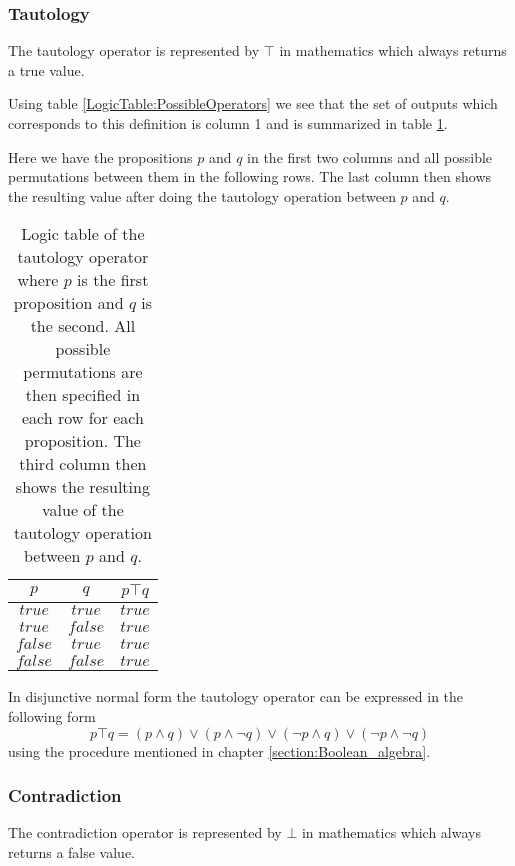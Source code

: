     \subsubsection{Tautology}
        The tautology operator is represented by $\top$ in mathematics which always returns a true value.
        
        Using table \ref{LogicTable:PossibleOperators} we see that the set of outputs which corresponds to this definition is column 1 and is summarized in table \ref{LogicTable:tautology}.
        
        Here we have the propositions $p$ and $q$ in the first two columns and all possible permutations between them in the following rows. The last column then shows the resulting value after doing the tautology operation between $p$ and $q$.
        
        \begin{table}[h!]
            \centering
            \begin{tabular}{|c|c|c|}
            	\hline
            	  $p$   &   $q$   & $p \top q$ \\ \hline
            	$true$  & $true$  &   $true$   \\ \hline
            	$true$  & $false$ &   $true$   \\ \hline
            	$false$ & $true$  &   $true$   \\ \hline
            	$false$ & $false$ &   $true$   \\ \hline
            \end{tabular}
            \caption{Logic table of the tautology operator where $p$ is the first proposition and $q$ is the second. All possible permutations are then specified in each row for each proposition. The third column then shows the resulting value of the tautology operation between $p$ and $q$.}
            \label{LogicTable:tautology}
        \end{table}
        
        In disjunctive normal form the tautology operator can be expressed in the following form
        \begin{equation}
            p \top q = (p \wedge q) \vee (p \wedge \neg q) \vee (\neg p \wedge q) \vee (\neg p \wedge \neg q)
        \end{equation}
        using the procedure mentioned in chapter \ref{section:Boolean_algebra}.
    
    \subsubsection{Contradiction}
        The contradiction operator is represented by $\bot$ in mathematics which always returns a false value.
        
